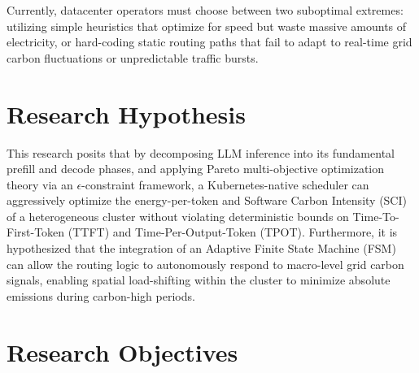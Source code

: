 \documentclass[12pt,a4paper,oneside]{report}
\begin{document}
Currently, datacenter operators must choose between two suboptimal extremes: utilizing simple heuristics that optimize for speed but waste massive amounts of electricity, or hard-coding static routing paths that fail to adapt to real-time grid carbon fluctuations or unpredictable traffic bursts. 

\section{Research Hypothesis}
\label{sec:intro_hypothesis}

This research posits that by decomposing LLM inference into its fundamental prefill and decode phases, and applying Pareto multi-objective optimization theory via an \(\epsilon\)-constraint framework, a Kubernetes-native scheduler can aggressively optimize the energy-per-token and Software Carbon Intensity (SCI) of a heterogeneous cluster without violating deterministic bounds on Time-To-First-Token (TTFT) and Time-Per-Output-Token (TPOT). Furthermore, it is hypothesized that the integration of an Adaptive Finite State Machine (FSM) can allow the routing logic to autonomously respond to macro-level grid carbon signals, enabling spatial load-shifting within the cluster to minimize absolute emissions during carbon-high periods.

\section{Research Objectives}
\label{sec:intro_objectives}
\end{document}
